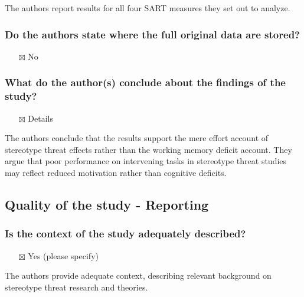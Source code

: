 \documentclass[
  doc, a4paper]{apa7}
\providecommand{\tightlist}{%
  \setlength{\itemsep}{0pt}\setlength{\parskip}{0pt}}
\begin{document}
The authors report results for all four SART measures they set out to analyze.

\subsubsection{Do the authors state where the full original data are stored?}\label{do-the-authors-state-where-the-full-original-data-are-stored}

\begin{itemize}
\tightlist
\item[$\boxtimes$]
  No
\end{itemize}

\subsubsection{What do the author(s) conclude about the findings of the study?}\label{what-do-the-authors-conclude-about-the-findings-of-the-study}

\begin{itemize}
\tightlist
\item[$\boxtimes$]
  Details
\end{itemize}

The authors conclude that the results support the mere effort account of stereotype threat effects rather than the working memory deficit account. They argue that poor performance on intervening tasks in stereotype threat studies may reflect reduced motivation rather than cognitive deficits.

\subsection{Quality of the study - Reporting}\label{quality-of-the-study---reporting}

\subsubsection{Is the context of the study adequately described?}\label{is-the-context-of-the-study-adequately-described}

\begin{itemize}
\tightlist
\item[$\boxtimes$]
  Yes (please specify)
\end{itemize}

The authors provide adequate context, describing relevant background on stereotype threat research and theories.
\end{document}
